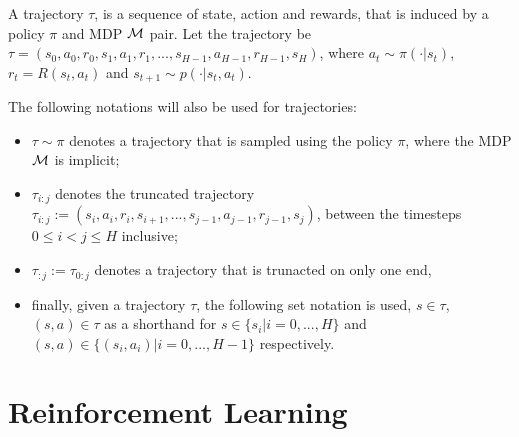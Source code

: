    \begin{defn}
        \label{def:trajectory}
        A \textnormal{trajectory} $\tau$, is a sequence of state, action and rewards, that is induced by a policy $\pi$ and MDP $\mathcal{M}$ pair. Let the trajectory be $\tau = (s_0, a_0, r_0, s_1, a_1, r_1, ..., s_{H-1}, a_{H-1}, r_{H-1}, s_H)$, where $a_t \sim \pi(\cdot|s_t)$, $r_t=R(s_t,a_t)$ and $s_{t+1} \sim p(\cdot|s_t,a_t)$. 
        
        The following notations will also be used for trajectories:
        \begin{itemize}
            \item $\tau\sim\pi$ denotes a trajectory that is sampled using the policy $\pi$, where the MDP $\mathcal{M}$ is implicit;
            \item $\tau_{i:j}$ denotes the \textnormal{truncated trajectory} $\tau_{i:j}:=(s_i, a_i, r_i, s_{i+1}, ..., s_{j-1}, a_{j-1}, r_{j-1}, s_j)$, between the timesteps $0\leq i < j \leq H$ inclusive;
            \item $\tau_{:j}:=\tau_{0:j}$ denotes a trajectory that is trunacted on only one end,
            \item finally, given a trajectory $\tau$, the following set notation is used, $s\in \tau$, $(s,a)\in\tau$ as a shorthand for $s\in\{s_i|i=0,...,H\}$ and $(s,a)\in\{(s_i,a_i)|i=0,...,H-1\}$ respectively. 
        \end{itemize}
    \end{defn}









\section{Reinforcement Learning}
\label{sec:2-2-rl}

